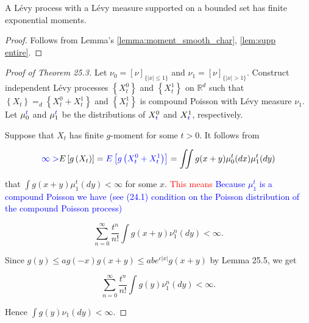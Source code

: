 \documentclass[a4paper,11pt]{article}
\begin{document}
\begin{corollary}
    A L\'{e}vy process with a L\'{e}vy measure supported on a bounded set has finite exponential moments.
\end{corollary}
\begin{proof}
    Follows from Lemma's \ref{lemma:moment_smooth_char}, \ref{lem:supp entire}.
\end{proof}

\begin{proof}[Proof of Theorem 25.3]

    Let $\nu_{0}=[\nu]_{\{|x| \leq 1\}}$ and $\nu_{1}=[\nu]_{\{|x|>1\}}$. Construct
    independent Lévy processes $\left\{X_{t}^{0}\right\}$ and $\left\{X_{t}^{1}\right\}$ on $\mathbb{R}^{d}$ such
    that $\left\{X_{t}\right\} =_{d} \left\{X_{t}^{0}+ X_{t}^{1}\right\}$ and
    $\left\{X_{t}^{1}\right\}$ is compound Poisson with Lévy measure $\nu_{1}$. Let $\mu_{0}^{\textcolor{blue}{t}}$ and $\mu_{1}^{\textcolor{blue}{t}}$ be
    the distributions of $X_{\textcolor{blue}{t}}^{0}$ and $X_{\textcolor{blue}{t}}^{1}$, respectively.

    Suppose that $X_{t}$ has finite $g$-moment for some $t>0$. It follows from

    $$
        \textcolor{blue}{\infty>}E\left[g\left(X_{t}\right)\right]
        = \textcolor{blue}{ E\left[g\left(X^{0}_{t} + X^{1}_{t}\right)\right]}
        = \iint g(x+y) \mu_{0}^{t}(dx) \mu_{1}^{t}(dy)
    $$

    that $\int g(x+y) \mu_{1}^{t}(dy)<\infty$ for some $x$. \textcolor{red}{This means}  \textcolor{blue}{ Because $\mu_{1}^{t}$ is a compound Poisson we have (see (24.1) condition on the Poisson distribution of the compound Poisson process)}

    $$
        \sum_{n=0}^{\infty} \frac{t^{n}}{n !} \int g(x+y) \nu_{1}^{n}(dy)<\infty.
    $$

    Since $g(y) \leq a g(-x) g(x+y) \leq a b e^{c|x|} g(x+y)$ by Lemma 25.5, we get


    \begin{equation*}
        \sum_{n=0}^{\infty} \frac{t^{n}}{n !} \int g(y) \nu_{1}^{n}(dy)<\infty. \tag{25.4}
    \end{equation*}

    Hence $\int g(y) \nu_{1}(d y)<\infty$.


\end{proof}
\end{document}
